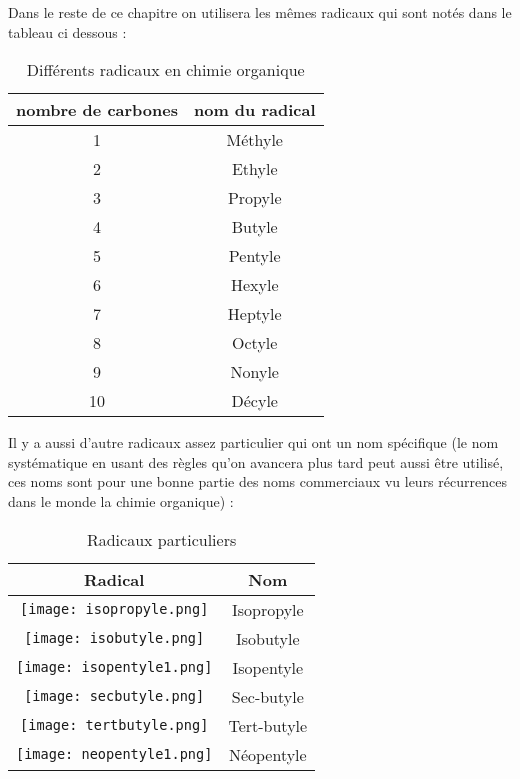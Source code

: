 \documentclass[a4paper, oneside]{book}
\begin{document}
Dans le reste de ce chapitre on utilisera les mêmes radicaux qui sont notés dans le tableau ci dessous :\\
\begin{table}[!h]
    \centering
    \begin{tabular}{|c|c|}
    \hline
    \textbf{nombre de carbones} & \textbf{nom du radical} \\
    \hline
     1 & Méthyle \\
     \hline
      2 & Ethyle \\
     \hline
      3 & Propyle \\
     \hline
      4 & Butyle \\
     \hline
      5 & Pentyle \\
     \hline
      6 & Hexyle \\
     \hline
      7 & Heptyle \\
     \hline
      8 & Octyle \\
     \hline
      9 & Nonyle \\
     \hline
      10 & Décyle \\
     \hline
\end{tabular}
    \caption{Différents radicaux en chimie organique}
    \label{fig:my_label}
\end{table}
\newline
Il y a aussi d'autre radicaux assez particulier qui ont un nom spécifique (le nom systématique en usant des règles qu'on avancera plus tard peut aussi être utilisé, ces noms sont pour une bonne partie des noms commerciaux vu leurs récurrences dans le monde la chimie organique) : 
\begin{table}[!h]
    \centering
    \begin{tabular}{|c|c|}
        \hline
        \textbf{Radical} & \textbf{Nom}  \\
        \hline
        \texttt{[image: isopropyle.png]} & Isopropyle \\
        \hline
        \texttt{[image: isobutyle.png]} & Isobutyle \\
        \hline
        \texttt{[image: isopentyle1.png]} & Isopentyle \\
        \hline
        \texttt{[image: secbutyle.png]} & Sec-butyle \\
        \hline
        \texttt{[image: tertbutyle.png]} & Tert-butyle \\
        \hline
        \texttt{[image: neopentyle1.png]} & Néopentyle \\
        \hline
    \end{tabular}
    \caption{Radicaux particuliers}
    \label{fig:my_label}
\end{table}
\newpage
\end{document}
